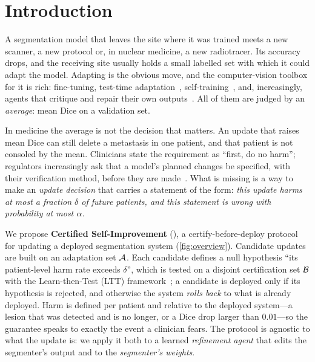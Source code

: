 \section{Introduction}
\label{sec:intro}

A segmentation model that leaves the site where it was trained meets a new scanner, a new protocol or, in nuclear medicine, a new radiotracer.
Its accuracy drops, and the receiving site usually holds a small labelled set with which it could adapt the model.
Adapting is the obvious move, and the computer-vision toolbox for it is rich: fine-tuning, test-time adaptation~\cite{sun2020ttt,wang2021tent,karani2021tta}, self-training~\cite{lee2013pseudo,xie2020noisy}, and, increasingly, agents that critique and repair their own outputs~\cite{madaan2023selfrefine,shinn2023reflexion}.
All of them are judged by an \emph{average}: mean Dice on a validation set.

In medicine the average is not the decision that matters.
An update that raises mean Dice can still delete a metastasis in one patient, and that patient is not consoled by the mean.
Clinicians state the requirement as ``first, do no harm''; regulators increasingly ask that a model's planned changes be specified, with their verification method, before they are made~\cite{fda2023pccp,feng2022monitoring}.
What is missing is a way to make an \emph{update decision} that carries a statement of the form: \emph{this update harms at most a fraction $\delta$ of future patients, and this statement is wrong with probability at most $\alpha$.}

 We propose \textbf{Certified Self-Improvement} (\ours), a certify-before-deploy protocol for updating a deployed segmentation system (\cref{fig:overview}).
Candidate updates are built on an adaptation set $\mathcal{A}$.
Each candidate defines a null hypothesis ``its patient-level harm rate exceeds $\delta$'', which is tested on a disjoint certification set $\mathcal{B}$ with the Learn-then-Test (LTT) framework~\cite{angelopoulos2021ltt}; a candidate is deployed only if its hypothesis is rejected, and otherwise the system \emph{rolls back} to what is already deployed.
Harm is defined per patient and relative to the deployed system---a lesion that was detected and is no longer, or a Dice drop larger than $0.01$---so the guarantee speaks to exactly the event a clinician fears.
The protocol is agnostic to what the update is: we apply it both to a learned \emph{refinement agent} that edits the segmenter's output and to the \emph{segmenter's weights}.

